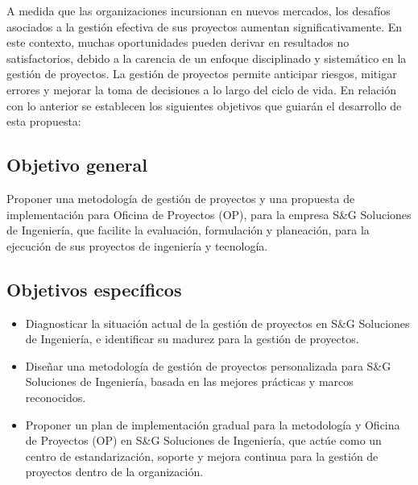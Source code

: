\begin{flushleft}
A medida que las organizaciones incursionan en nuevos mercados, los desafíos asociados a la gestión efectiva de sus proyectos aumentan significativamente. En este contexto, muchas oportunidades pueden derivar en resultados no satisfactorios, debido a la carencia de un enfoque disciplinado y sistemático en la gestión de proyectos. La gestión de proyectos permite anticipar riesgos, mitigar errores y mejorar la toma de decisiones a lo largo del ciclo de vida.
En relación con lo anterior se establecen los siguientes objetivos que guiarán el desarrollo de esta propuesta:

\subsection*{Objetivo general}
Proponer una metodología de gestión de proyectos y una propuesta de implementación para Oficina de Proyectos (OP), para la empresa S\&G Soluciones de Ingeniería, que facilite la evaluación, formulación y planeación, para la ejecución de sus proyectos de ingeniería y tecnología.
\subsection*{Objetivos específicos}
\begin{itemize}
    \item Diagnosticar la situación actual de la gestión de proyectos en S\&G Soluciones de Ingeniería, e identificar su madurez para la gestión de proyectos.
    \item Diseñar una metodología de gestión de proyectos personalizada para S\&G Soluciones de Ingeniería, basada en las mejores prácticas y marcos reconocidos.
    \item Proponer un plan de implementación gradual para la metodología y Oficina de Proyectos (OP) en S\&G Soluciones de Ingeniería, que actúe como un centro de estandarización, soporte y mejora continua para la gestión de proyectos dentro de la organización.
\end{itemize}
\end{flushleft}